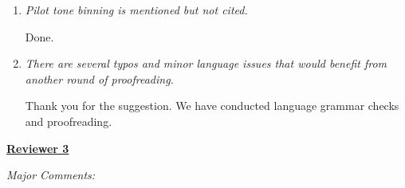 \documentclass[a4paper,11pt]{report}
\begin{document}
\begin{enumerate}[resume]
	\item \textit{Pilot tone binning is mentioned but not cited.}

\hspace{1em} Done.

	\item \textit{There are several typos and minor language issues that would benefit from another round of proofreading.}

\hspace{1em} Thank you for the suggestion. We have conducted language grammar checks and proofreading.

\end{enumerate}

\vfill
\pagebreak


\noindent \underline{\textbf{Reviewer 3}}

\noindent \textit{Major Comments:}
\end{document}

